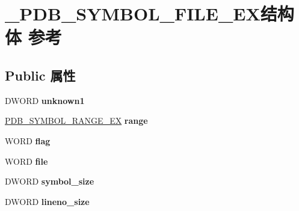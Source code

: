 \hypertarget{struct___p_d_b___s_y_m_b_o_l___f_i_l_e___e_x}{}\section{\+\_\+\+P\+D\+B\+\_\+\+S\+Y\+M\+B\+O\+L\+\_\+\+F\+I\+L\+E\+\_\+\+E\+X结构体 参考}
\label{struct___p_d_b___s_y_m_b_o_l___f_i_l_e___e_x}
\subsection*{Public 属性}
\begin{DoxyCompactItemize}
\item 
\mbox{\label{struct___p_d_b___s_y_m_b_o_l___f_i_l_e___e_x_a1bcd164996d43defeee590bc3b35d693}} 
D\+W\+O\+RD {\bfseries unknown1}
\item 
\mbox{\label{struct___p_d_b___s_y_m_b_o_l___f_i_l_e___e_x_af35d54208951970dea3508fcf7f3b4fb}} 
\hyperlink{struct___p_d_b___s_y_m_b_o_l___r_a_n_g_e___e_x}{P\+D\+B\+\_\+\+S\+Y\+M\+B\+O\+L\+\_\+\+R\+A\+N\+G\+E\+\_\+\+EX} {\bfseries range}
\item 
\mbox{\label{struct___p_d_b___s_y_m_b_o_l___f_i_l_e___e_x_a5045db1cb1c53fced5d20a72b2f569ca}} 
W\+O\+RD {\bfseries flag}
\item 
\mbox{\label{struct___p_d_b___s_y_m_b_o_l___f_i_l_e___e_x_a7d91abace1038b23a876cda43dadae1e}} 
W\+O\+RD {\bfseries file}
\item 
\mbox{\label{struct___p_d_b___s_y_m_b_o_l___f_i_l_e___e_x_a2d57278ba2c5040d0846b59dbf502b5d}} 
D\+W\+O\+RD {\bfseries symbol\+\_\+size}
\item 
\mbox{\label{struct___p_d_b___s_y_m_b_o_l___f_i_l_e___e_x_a296a021299547593c1cd9e22c8bd10ea}} 
D\+W\+O\+RD {\bfseries lineno\+\_\+size}
\item 
\mbox{\label{struct___p_d_b___s_y_m_b_o_l___f_i_l_e___e_x_a78d75f6f430f2521c81f869331bacc91}} 

\end{DoxyCompactItemize}
